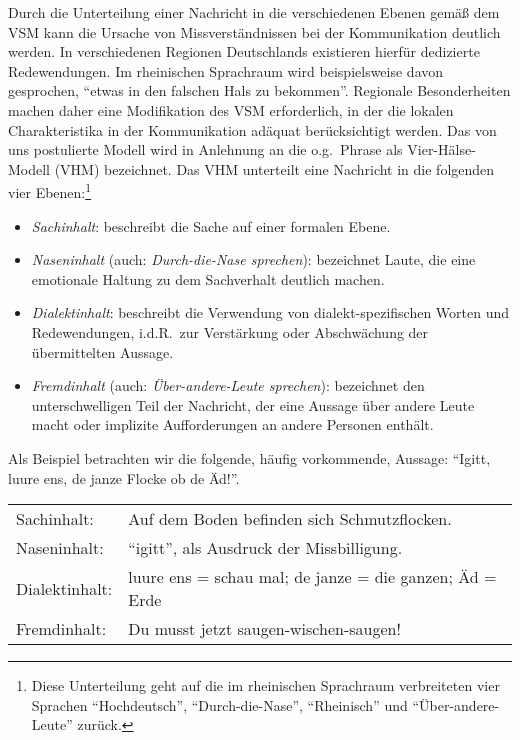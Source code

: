 \documentclass[11pt,DIV16,twocolumn]{scrartcl}
\begin{document}
Durch die Unterteilung einer Nachricht in die verschiedenen Ebenen
gemäß dem VSM kann die Ursache von Missverständnissen bei der
Kommunikation deutlich werden.  In verschiedenen Regionen Deutschlands
existieren hierfür dedizierte Redewendungen.  Im rheinischen
Sprachraum wird beispielsweise davon gesprochen, "`etwas in den
falschen Hals zu bekommen"'.  Regionale Besonderheiten machen daher
eine Modifikation des VSM erforderlich, in der die lokalen
Charakteristika in der Kommunikation adäquat berücksichtigt werden.
Das von uns postulierte Modell wird in Anlehnung an die o.g.\ Phrase
als Vier-Hälse-Modell (VHM) bezeichnet.  Das VHM unterteilt eine
Nachricht in die folgenden vier Ebenen:\footnote{Diese Unterteilung
  geht auf die im rheinischen Sprachraum verbreiteten vier Sprachen
  "`Hochdeutsch"', "`Durch-die-Nase"', "`Rheinisch"' und
  "`Über-andere-Leute"' zurück.}
%
\begin{itemize}
\item \textit{Sachinhalt}: beschreibt die Sache auf einer formalen
  Ebene.
\item \textit{Naseninhalt} (auch: \textit{Durch-die-Nase sprechen}):
  bezeichnet Laute, die eine emotionale Haltung zu dem Sachverhalt
  deutlich machen.
\item \textit{Dialektinhalt}: beschreibt die Verwendung von
  dialekt-spezifischen Worten und Redewendungen, i.d.R.\ zur
  Verstärkung oder Abschwächung der übermittelten Aussage.
\item \textit{Fremdinhalt} (auch: \textit{Über-andere-Leute
    sprechen}): bezeichnet den unterschwelligen Teil der Nachricht,
  der eine Aussage über andere Leute macht oder implizite
  Aufforderungen an andere Personen enthält.
\end{itemize}
%
Als Beispiel betrachten wir die folgende, häufig vorkommende, Aussage:
"`Igitt, luure ens, de janze Flocke ob de Äd!"'.
%
\begin{center}
  \begin{tabularx}{\linewidth}{lX}
    Sachinhalt: & Auf dem Boden befinden sich Schmutzflocken. \\
    Naseninhalt: & "`igitt"', als Ausdruck der Missbilligung. \\
    Dialektinhalt: & luure ens = schau mal; de janze = die ganzen; Äd = Erde \\
    Fremdinhalt: & Du musst jetzt saugen-wischen-saugen!
  \end{tabularx}
\end{center}
\end{document}
